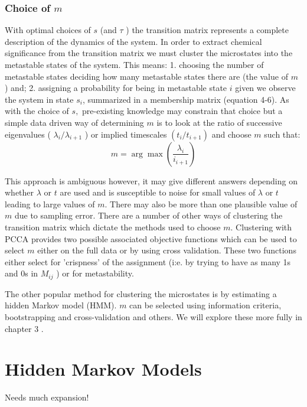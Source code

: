 \subsubsection{Choice of $m$}
With optimal choices of $s$ (and $\tau$ ) the transition matrix represents a complete description of the dynamics of the system. In order to extract chemical significance from the transition matrix we must cluster the microstates into the metastable states of the system. This means:
1. choosing the number of metastable states deciding how many metastable states there are (the value of $m$ ) and;
2. assigning a probability for being in metastable state $i$ given we observe the system in state $s_{i}$, summarized in a membership matrix (equation 4-6).
As with the choice of $s,$ pre-existing knowledge may constrain that choice but a simple data driven way of determining $m$ is to look at the ratio of successive eigenvalues ( $\lambda_{i} / \lambda_{i+1}$ ) or implied timescales $\left(t_{i} / t_{i+1}\right)$ and choose $m$ such that:
\begin{equation}
m=\arg \max \left(\frac{\lambda_{i}}{i_{i+1}}\right)
\end{equation}

This approach is ambiguous however, it may give different answers depending on whether $\lambda$ or $t$ are used and is susceptible to noise for small values of $\lambda$ or $t$ leading to large values of $m$. There may also be more than one plausible value of $m$ due to sampling error.
There are a number of other ways of clustering the transition matrix which dictate the methods used to choose $m$. Clustering with PCCA provides two possible associated objective functions which can be used to select $m$ either on the full data or by using cross validation. These two functions either select for 'crispness' of the assignment (i:e. by trying to have as many 1s and 0s in $M_{i j}$ ) or for metastability.

The other popular method for clustering the microstates is by estimating a hidden Markov model (HMM). $m$ can be selected using information criteria, bootstrapping and cross-validation and others. We will explore these more fully in chapter 3 .

\section{Hidden Markov Models}\label{sec:theory_hmm}

Needs much expansion!

